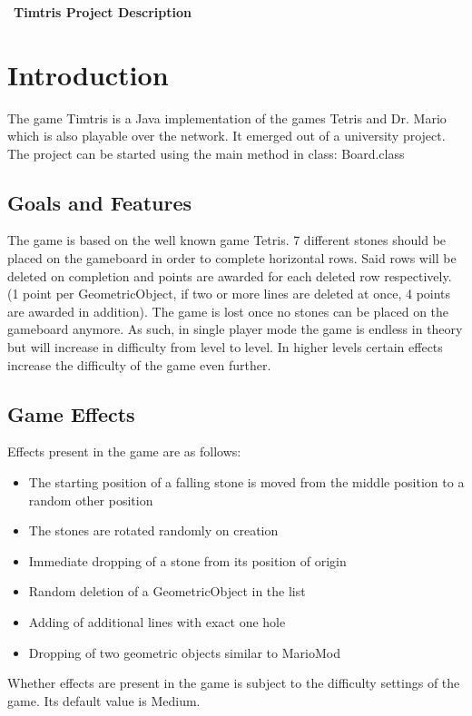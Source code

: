 \documentclass[10pt,a4paper,titlepage]{article}
\begin{document}
	\tableofcontents
	\ \\\\\\\
	\textbf{\large Timtris Project Description}\\
	\section{Introduction}
	The game Timtris is a Java implementation of the games Tetris and Dr. Mario which is also playable over the network. It emerged out of a university project.\\
	The project can be started using the main method in class: Board.class\\
	\subsection{Goals and Features}
	The game is based on the well known game Tetris.
	7 different stones should be placed on the gameboard in order to complete horizontal rows. Said rows will be deleted on completion and points are awarded for each deleted row respectively. (1 point per GeometricObject, if two or more lines are deleted at once, 4 points are awarded in addition). The game is lost once no stones can be placed on the gameboard anymore. As such, in single player mode the game is endless in theory but will increase in difficulty from level to level. In higher levels certain effects increase the difficulty of the game even further.
	\subsection{Game Effects}
	Effects present in the game are as follows:
	\begin{itemize}
		\item The starting position of a falling stone is moved from the middle position to a random other position
		\item The stones are rotated randomly on creation
		\item Immediate dropping of a stone from its position of origin
		\item Random deletion of a GeometricObject in the list
		\item Adding of additional lines with exact one hole
		\item Dropping of two geometric objects similar to MarioMod 
	\end{itemize}
	Whether effects are present in the game is subject to the difficulty settings of the game. Its default value is Medium.
\end{document}
